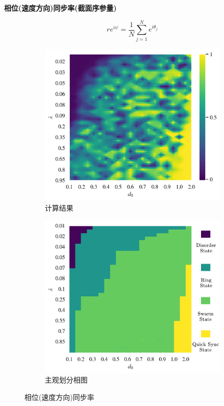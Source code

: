 \documentclass{article}
\begin{document}
\noindent\textbf{相位(速度方向)同步率(截面序参量)}

$$
r e^{i\psi}=\frac{1}{N}\sum_{j=1}^{N}{e^{i\theta _j}}
$$

\begin{figure}[H]
	\centering
	\begin{subfigure}[b]{0.49\textwidth}
		\includegraphics[width=\textwidth]{./figs/phaseSyncOp.png}
		\vspace{-1cm}
		\caption{计算结果}
	\end{subfigure}
	\begin{subfigure}[b]{0.49\textwidth}
		\includegraphics[width=\textwidth]{./figs/subjectiveOp2.png}
		\vspace{-1cm}
		\caption{主观划分相图}
	\end{subfigure}
	\vspace{-0.5cm}
	\caption{相位(速度方向)同步率}
	\label{fig:fig234c.1}
\end{figure}
\end{document}
